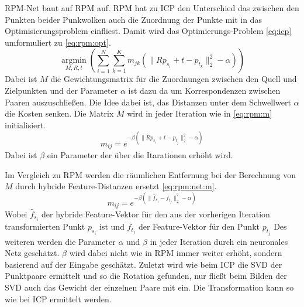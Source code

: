 \documentclass[12pt,titlepage, twoside]{article}
\begin{document}

RPM-Net baut auf RPM \cite{RPM} auf. RPM hat zu ICP den Unterschied das zwischen den Punkten beider Punkwolken auch die Zuordnung der Punkte mit in das Optimisierungsproblem einfliest.
Damit wird das Optimierungs-Problem \ref{eq:icp} umformuliert zu \ref{eq:rpm:opt}.
\begin{equation}
    \label{eq:rpm:opt}
    \underset{M,R,t}{\operatorname{argmin}}(\sum_{i=1}^N\sum_{k=1}^K{m_{jk}(\|Rp_{s_i} + t - p_{t_k}\|_2^2-\alpha)})
\end{equation}
Dabei ist $M$ die Gewichtungsmatrix für die Zuordnungen zwischen den Quell und Zielpunkten und der Parameter $\alpha$ ist dazu da um Korrespondenzen zwischen Paaren auszuschließen. 
Die Idee dabei ist, das Distanzen unter dem Schwellwert $\alpha$ die Kosten senken.
Die Matrix $M$ wird in jeder Iteration wie in \ref{eq:rpm:m} initialisiert.
\begin{equation}
    \label{eq:rpm:m}
    m_{ij} = e^{-\beta(\|Rp_{s_i} + t - p_{t_j}\|_2^2-\alpha)}
\end{equation}
Dabei ist $\beta$ ein Parameter der über die Itarationen erhöht wird.

Im Vergleich zu RPM werden die räumlichen Entfernung bei der Berechnung von $M$ durch hybride Feature-Distanzen ersetzt \ref{eq:rpm:net:m}.
\begin{equation}
    \label{eq:rpm:net:m}
    m_{ij} = e^{-\beta(\|\hat{f}_{s_i} - f_{t_j}\|_2^2-\alpha)}
\end{equation}
Wobei $\hat{f}_{s_i}$ der hybride Feature-Vektor für den aus der vorherigen Iteration transformierten Punkt $p_{s_i}$ ist und $f_{t_j}$ der Feature-Vektor für den Punkt $p_{t_j}$
Des weiteren werden die Parameter $\alpha$ und $\beta$ in jeder Iteration durch ein neuronales Netz geschätzt. 
$\beta$ wird dabei nicht wie in RPM immer weiter erhöht, sondern basierend auf der Eingabe geschätzt.
Zuletzt wird wie beim ICP die SVD der Punktpaare ermittelt und so die Rotation gefunden, nur fließt beim Bilden der SVD auch das Gewicht der einzelnen Paare mit ein. 
Die Transformation kann so wie bei ICP ermittelt werden. 
\end{document}
